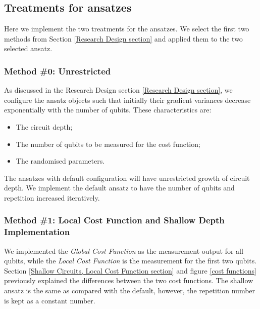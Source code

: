 \subsection{Treatments for ansatzes}
Here we implement the two treatments for the ansatzes.
We select the first two methods from Section \ref{Research Design section} and applied them to the two selected ansatz.

\subsubsection{Method \#0: Unrestricted}
As discussed in the Research Design section \ref{Research Design section}, we configure the ansatz objects such that initially their gradient variances decrease exponentially with the number of qubits.
These characteristics are:
\begin{itemize}
    \item The circuit depth;
    \item The number of qubits to be measured for the cost function;
    \item The randomised parameters.
\end{itemize}
The ansatzes with default configuration will have unrestricted growth of circuit depth.
We implement the default ansatz to have the number of qubits and repetition increased iteratively.

\subsubsection{Method \#1: Local Cost Function and Shallow Depth Implementation}
We implemented the \textit{Global Cost Function} as the measurement output for all qubits, while the \textit{Local Cost Function} is the measurement for the first two qubits.
Section \ref{Shallow Circuits, Local Cost Function section} and figure \ref{cost functions} previously explained the differences between the two cost functions.
The shallow ansatz is the same as compared with the default, however, the repetition number is kept as a constant number.